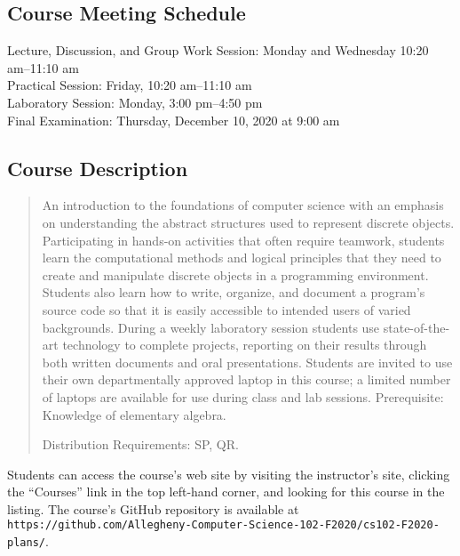 \documentclass[11pt]{article}
\newcommand{\url}[1]{\lstinline{#1}}
\begin{document}
\vspace*{-.1in}

\subsection*{Course Meeting Schedule}

Lecture, Discussion, and Group Work Session: Monday and Wednesday 10:20 am--11:10 am \\
Practical Session: Friday, 10:20 am--11:10 am \\
Laboratory Session: Monday, 3:00 pm--4:50 pm \\
Final Examination: Thursday, December 10, 2020 at 9:00 am

\vspace*{-.05in}

\subsection*{Course Description}

\begin{quote}

An introduction to the foundations of computer science with an emphasis on
understanding the abstract structures used to represent discrete objects.
Participating in hands-on activities that often require teamwork, students
learn the computational methods and logical principles that they need to create
and manipulate discrete objects in a programming environment. Students also
learn how to write, organize, and document a program’s source code so that it
is easily accessible to intended users of varied backgrounds. During a weekly
laboratory session students use state-of-the-art technology to complete
projects, reporting on their results through both written documents and oral
presentations. Students are invited to use their own departmentally approved
laptop in this course; a limited number of laptops are available for use during
class and lab sessions. Prerequisite: Knowledge of elementary algebra.

Distribution Requirements: SP, QR.\@ \\

\end{quote}

\noindent Students can access the course's web site by visiting the
instructor's site, clicking the ``Courses'' link in the top left-hand corner,
and looking for this course in the listing. The course's GitHub repository is
available at
\url{https://github.com/Allegheny-Computer-Science-102-F2020/cs102-F2020-plans/}.
\end{document}
